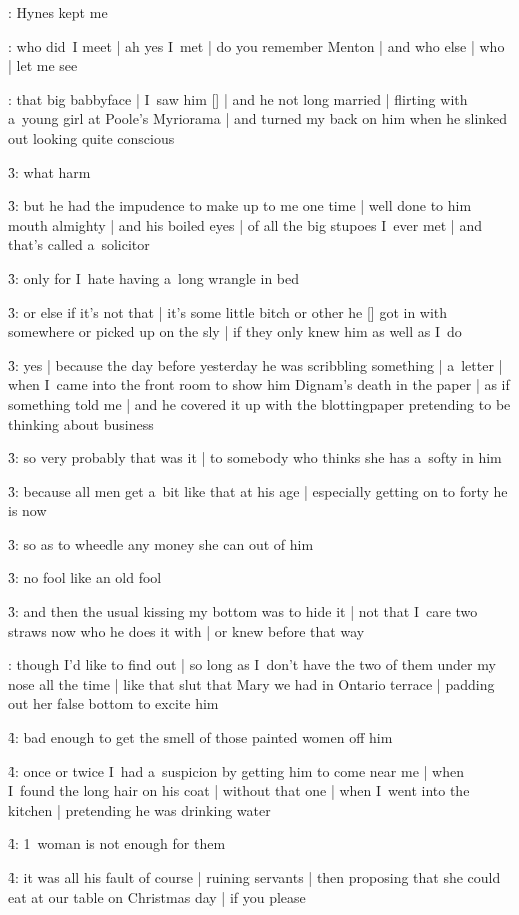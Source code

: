 :
Hynes kept me

:
who did~I meet |
ah yes I~met |
do you remember Menton |
and who else |
who |
let me see

:
that big babbyface |
I~saw him [\menton] |
and he not long married |
flirting with a~young girl at Poole's Myriorama |
and turned my back on him when he slinked out looking quite conscious

\f3:
what harm

\f3:
but he had the impudence to make up to me one time |
well done to him mouth almighty |
and his boiled eyes |
of all the big stupoes I~ever met |
and that's called a~solicitor

\f3:
only for I~hate having a~long wrangle in bed

\f3:
or else if it's not that |
it's some little bitch or other
he [\bloom] got in with somewhere or picked up on the sly |
if they only knew him as well as I~do

\f3:
yes |
because the day before yesterday he was scribbling something |
a~letter |
when I~came into the front room to show him Dignam's death in the paper |
as if something told me |
and he covered it up with the blottingpaper
pretending to be thinking about business

\f3:
so very probably that was it |
to somebody who thinks she has a~softy in him

\f3:
because all men get a~bit like that at his age |
especially getting on to forty he is now

\f3:
so as to wheedle any money she can out of him

\f3:
no fool like an old fool

\f3:
and then the usual kissing my bottom was to hide it |
not that I~care two straws now who he does it with |
or knew before that way

:
though I'd like to find out |
so long as I~don't have the two of them under my nose all the time |
like that slut that Mary we had in Ontario terrace |
padding out her false bottom to excite him

\f4:
bad enough to get the smell of those painted women off him

\f4:
once or twice I~had a~suspicion by getting him to come near me |
when I~found the long hair on his coat |
without that one |
when I~went into the kitchen |
pretending he was drinking water

\f4:
1~woman is not enough for them

\f4:
it was all his fault of course |
ruining servants |
then proposing that she could eat at our table on Christmas day |
if you please

